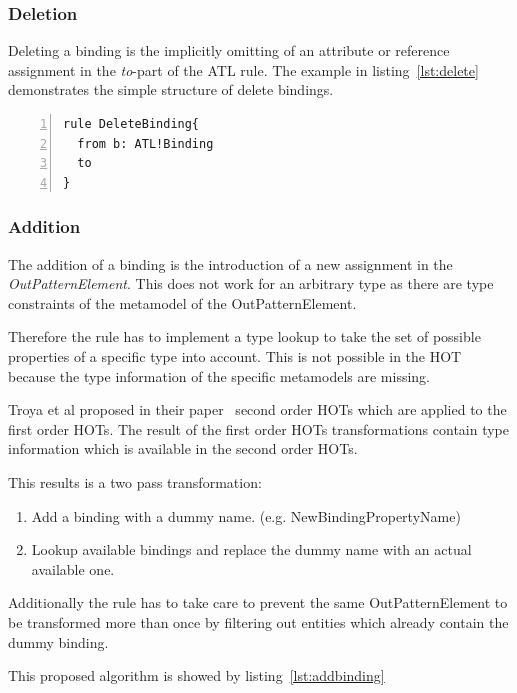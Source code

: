\documentclass{llncs}
\begin{document}
\subsubsection{Deletion}

Deleting a binding is the implicitly omitting of an attribute or reference assignment in the \emph{to}-part of the ATL rule. The example in listing~\ref{lst:delete} demonstrates the simple structure of delete bindings.

\begin{lstlisting}[language=ATL, numbers=left,xleftmargin=5.0ex, caption=Definition of Delete-Binding., label=lst:delete]
rule DeleteBinding{
  from b: ATL!Binding
  to
}
\end{lstlisting}

\subsubsection{Addition}

The addition of a binding is the introduction of a new assignment in the \emph{OutPatternElement}. This does not work for an arbitrary type as there are type constraints of the metamodel of the OutPatternElement.

Therefore the rule has to implement a type lookup to take the set of possible properties of a specific type into account. This is not possible in the HOT because the type information of the specific metamodels are missing. 

Troya et al proposed in their paper~\cite{Bergmayr:2014} second order HOTs which are applied to the first order HOTs. The result of the first order HOTs transformations contain type information which is available in the second order HOTs.

This results is a two pass transformation:

\begin{enumerate}
	\item Add a binding with a dummy name. (e.g. NewBindingPropertyName)
	\item Lookup available bindings and replace the dummy name with an actual available one.
\end{enumerate}

Additionally the rule has to take care to prevent the same OutPatternElement to be transformed more than once by filtering out entities which already contain the dummy binding.

This proposed algorithm is showed by listing~\ref{lst:addbinding}
\end{document}
